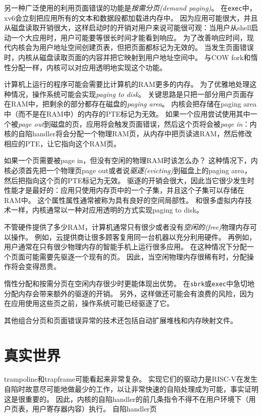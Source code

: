 另一种广泛使用的利用页面错误的功能是\emph{按需分页(demand paging)}。
在\texttt{exec}中，xv6会立刻把应用所有的文本和数据段都加载进内存中。
因为应用可能很大，并且从磁盘读取开销很大，这样启动时的开销对用户来说可能很可观：当用户从shell启动一个大应用时，用户可能要等很长时间才能看到响应。
为了改善响应时间，现代内核会为用户地址空间创建页表，但把页面都标记为无效的。
当发生页面错误时，内核从磁盘读取页面的内容并把它映射到用户地址空间中。
与COW fork和惰性分配一样，内核可以对应用透明地实现这个功能。

计算机上运行的程序可能会需要比计算机的RAM更多的内存。
为了优雅地处理这种情况，操作系统可能会实现\emph{paging to disk}。
关键思路是只把一部分用户页面存在RAM中，把剩余的部分都存在磁盘的\emph{paging area}。
内核会把存储在paging area中（而不是在RAM中）的内存的PTE标记为无效。
如果一个应用尝试使用其中一个被\emph{page out}到磁盘的页，应用将会触发页面错误，然后这个页将会被\emph{page in}：内核的自陷handler将会分配一个物理RAM页，从内存中把页读进RAM，然后修改相应的PTE，让它指向这个RAM页。

如果一个页需要被page in，但没有空闲的物理RAM时该怎么办？
这种情况下，内核必须首先把一个物理页page out或者说\emph{驱逐(evicting)}到磁盘上的paging area，然后把指向这个页的PTE标记为无效。
驱逐的开销会很大，因此当它很少发生时性能才是最好的：应用只使用内存页中的一个子集，并且这个子集可以存储在RAM中。
这个属性属性通常被称为具有良好的空间局部性。
和很多虚拟内存技术一样，内核通常以一种对应用透明的方式实现paging to disk。

不管硬件提供了多少RAM，计算机通常只有很少或者没有\emph{空闲的(free)}物理内存可以操作。
例如，云提供商让很多顾客复用同一台机器以充分利用硬件。
再例如，用户通常在只有很少物理内存的智能手机上运行很多应用。
在这种情况下分配一个页面可能需要先驱逐一个现有的页。
因此，当空闲物理内存很稀有时，分配操作将会变得昂贵。

惰性分配和按需分页在空闲内存很少时更能体现出优势。
在\texttt{sbrk}或\texttt{exec}中急切地分配内存会带来额外的驱逐的开销。
另外，这样做还可能会有浪费的风险，因为在应用使用这些页之前，操作系统可能已经驱逐了它。

其他组合分页和页面错误异常的技术还包括自动扩展堆栈和内存映射文件。

\section{真实世界}
trampoline和trapframe可能看起来非常复杂。
实现它们的驱动力是RISC-V在发生自陷时故意尽可能地做最少的工作，以让非常快速的自陷处理成为可能，事实证明这是很重要的。
因此，内核的自陷handler的前几条指令不得不在用户环境下（用户页表，用户寄存器内容）执行。
自陷handler页



